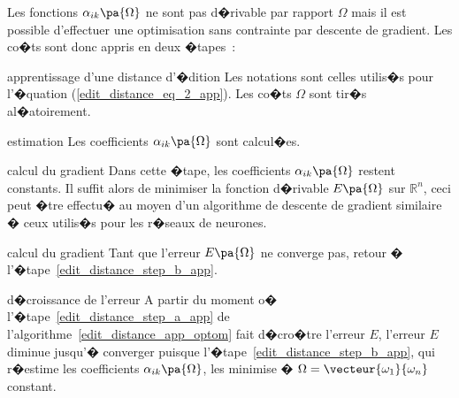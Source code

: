 Les fonctions $\alpha_{ik}\pa{\Omega}$ ne sont pas d�rivable par rapport $\Omega$ mais il est possible d'effectuer une optimisation sans contrainte par descente de gradient. Les co�ts sont donc appris en deux �tapes~:


		\begin{xalgorithm}{apprentissage d'une distance d'�dition}\label{edit_distance_app_optom}
		Les notations sont celles utilis�s pour l'�quation (\ref{edit_distance_eq_2_app}). Les co�ts $\Omega$ sont tir�s 
		al�atoirement.
		
		\begin{xalgostep}{estimation}\label{edit_distance_step_b_app}
		Les coefficients $\alpha_{ik}\pa{\Omega}$ sont calcul�es.
		\end{xalgostep}
		
		\begin{xalgostep}{calcul du gradient}\label{edit_distance_step_a_app}
		Dans cette �tape, les coefficients $\alpha_{ik}\pa{\Omega}$ restent constants. Il suffit alors de minimiser la fonction
		d�rivable $E\pa{\Omega}$ sur $\mathbb{R}^n$, ceci peut �tre effectu� au moyen d'un algorithme de descente de 
		gradient similaire � ceux utilis�s pour les r�seaux de neurones.
		\end{xalgostep}
		
		\begin{xalgostep}{calcul du gradient}\label{edit_distance_step_c_app}
		Tant que l'erreur $E\pa{\Omega}$ ne converge pas, retour � l'�tape~\ref{edit_distance_step_b_app}.
		\end{xalgostep}
		
		\end{xalgorithm}


\begin{xremark}{d�croissance de l'erreur}
A partir du moment o� l'�tape~\ref{edit_distance_step_a_app} de l'algorithme~\ref{edit_distance_app_optom} fait d�cro�tre l'erreur $E$, l'erreur $E$ diminue jusqu'� converger puisque l'�tape~\ref{edit_distance_step_b_app}, qui r�estime les coefficients $\alpha_{ik}\pa{\Omega}$, les minimise � $\Omega = \vecteur{\omega_1}{\omega_n}$ constant.
\end{xremark}














\newpage













